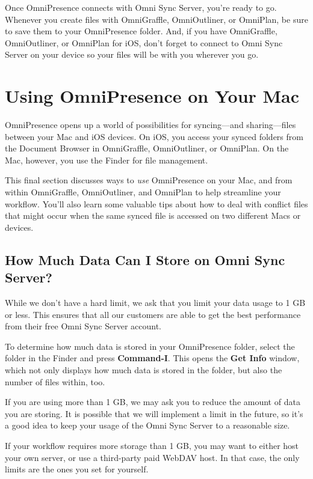 \documentclass[../main.tex]{subfiles}
\begin{document}
Once OmniPresence connects with Omni Sync Server, you're ready to go. Whenever you create files
with OmniGraffle, OmniOutliner, or OmniPlan, be sure to save them to your OmniPresence folder.
And, if you have OmniGraffle, OmniOutliner, or OmniPlan for iOS, don't forget to connect to
Omni Sync Server on your device so your files will be with you wherever you go.

\section{Using OmniPresence on Your Mac}

OmniPresence opens up a world of possibilities for syncing---and sharing---files between your
Mac and iOS devices. On iOS, you access your synced folders from the Document Browser in
OmniGraffle, OmniOutliner, or OmniPlan. On the Mac, however, you use the Finder for file
management.

This final section discusses ways to \textit{use} OmniPresence on your Mac, and from within
OmniGraffle, OmniOutliner, and OmniPlan to help streamline your workflow. You'll also learn
some valuable tips about how to deal with conflict files that might occur when the same synced
file is accessed on two different Macs or devices.

\subsection{How Much Data Can I Store on Omni Sync Server?}

While we don't have a hard limit, we ask that you limit your data usage to 1 GB or less. This
ensures that all our customers are able to get the best performance from their free Omni Sync
Server account.

To determine how much data is stored in your OmniPresence folder, select the folder in the
Finder and press \textbf{Command-I}. This opens the \textbf{Get Info} window, which not only
displays how much data is stored in the folder, but also the number of files within, too.


If you are using more than 1 GB, we may ask you to reduce the amount of data you are storing. It
is possible that we will implement a limit in the future, so it's a good idea to keep your
usage of the Omni Sync Server to a reasonable size.

If your workflow requires more storage than 1 GB, you may want to either host your own server,
or use a third-party paid WebDAV host. In that case, the only limits are the ones you set for
yourself.
\end{document}
